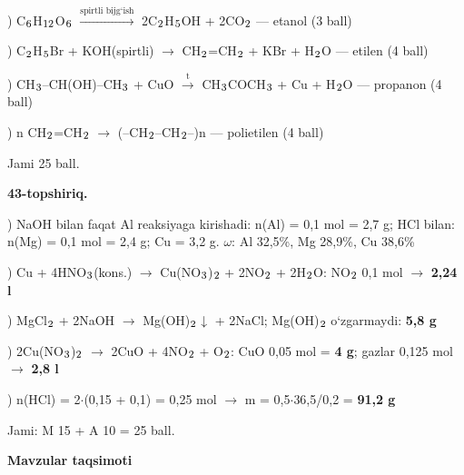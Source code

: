 \documentclass[11pt,a4paper]{article}
\renewcommand{\textsubscript}[1]{\ensuremath{_{\text{\fontsize{8}{8}\selectfont #1}}}}
\begin{document}
) C\textsubscript{6}H\textsubscript{12}O\textsubscript{6} $\xrightarrow{\text{spirtli bijg`ish}}$ 2C\textsubscript{2}H\textsubscript{5}OH + 2CO\textsubscript{2} --- etanol (3 ball)\par
{}) C\textsubscript{2}H\textsubscript{5}Br + KOH(spirtli) $\to$ CH\textsubscript{2}=CH\textsubscript{2} + KBr + H\textsubscript{2}O --- etilen (4 ball)\par
{}) CH\textsubscript{3}--CH(OH)--CH\textsubscript{3} + CuO $\xrightarrow{\text{t}}$ CH\textsubscript{3}COCH\textsubscript{3} + Cu + H\textsubscript{2}O --- propanon (4 ball)\par
{}) n CH\textsubscript{2}=CH\textsubscript{2} $\to$ (--CH\textsubscript{2}--CH\textsubscript{2}--)n --- polietilen (4 ball)\par
\noindent Jami 25 ball.\par
\noindent\textbf{43-topshiriq.}\par
{}) NaOH bilan faqat Al reaksiyaga kirishadi: n(Al) = 0,1 mol = 2,7 g; HCl bilan: n(Mg) = 0,1 mol = 2,4 g; Cu = 3,2 g. $\omega$: Al 32,5\%, Mg 28,9\%, Cu 38,6\%\par
{}) Cu + 4HNO\textsubscript{3}(kons.) $\to$ Cu(NO\textsubscript{3})\textsubscript{2} + 2NO\textsubscript{2} + 2H\textsubscript{2}O: NO\textsubscript{2} 0,1 mol $\to$ \textbf{2,24 l}\par
{}) MgCl\textsubscript{2} + 2NaOH $\to$ Mg(OH)\textsubscript{2}$\downarrow$ + 2NaCl; Mg(OH)\textsubscript{2} o`zgarmaydi: \textbf{5,8 g}\par
{}) 2Cu(NO\textsubscript{3})\textsubscript{2} $\to$ 2CuO + 4NO\textsubscript{2} + O\textsubscript{2}: CuO 0,05 mol = \textbf{4 g}; gazlar 0,125 mol $\to$ \textbf{2,8 l}\par
{}) n(HCl) = 2$\cdot$(0,15 + 0,1) = 0,25 mol $\to$ m = 0,5$\cdot$36,5/0,2 = \textbf{91,2 g}\par
\noindent Jami: M 15 + A 10 = 25 ball.\par
\par\bigskip\noindent\textbf{Mavzular taqsimoti}\par\smallskip
\end{document}
